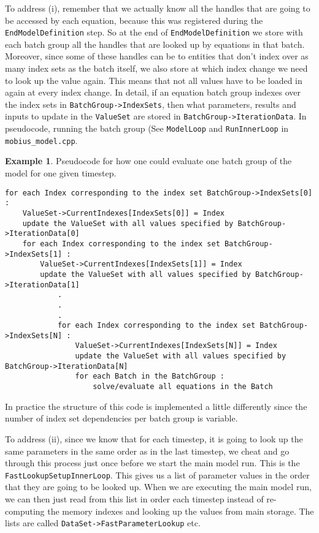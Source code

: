 \documentclass[11pt]{article}
\theoremstyle{definition}
\newtheorem{myexample}{Example}
\newenvironment{example}%
  {\begin{lrbox}{\examplebox}%
   \begin{minipage}{\dimexpr\linewidth-2\fboxsep}
   \begin{myexample}}%
  {\end{myexample}%
   \end{minipage}%
   \end{lrbox}%
   \begin{trivlist}
     \item[]\colorbox{silver}{\usebox\examplebox}
   \end{trivlist}}
\begin{document}
To address (i), remember that we actually know all the handles that are going to be accessed by each equation, because this was registered during the {\tt EndModelDefinition} step. So at the end of {\tt EndModelDefinition} we store with each batch group all the handles that are looked up by equations in that batch. Moreover, since some of these handles can be to entities that don't index over as many index sets as the batch itself, we also store at which index change we need to look up the value again. This means that not all values have to be loaded in again at every index change. In detail, if an equation batch group indexes over the index sets in {\tt BatchGroup->IndexSets}, then what parameters, results and inputs to update in the {\tt ValueSet} are stored in {\tt BatchGroup->IterationData}. In pseudocode, running the batch group (See {\tt ModelLoop} and {\tt RunInnerLoop} in {\tt mobius\_model.cpp}.

\begin{example}
Pseudocode for how one could evaluate one batch group of the model for one given timestep.
\begin{lstlisting}[style = mycpp]
for each Index corresponding to the index set BatchGroup->IndexSets[0] :
	ValueSet->CurrentIndexes[IndexSets[0]] = Index
	update the ValueSet with all values specified by BatchGroup->IterationData[0]
	for each Index corresponding to the index set BatchGroup->IndexSets[1] :
		ValueSet->CurrentIndexes[IndexSets[1]] = Index
		update the ValueSet with all values specified by BatchGroup->IterationData[1]
			.
			.
			.
			for each Index corresponding to the index set BatchGroup->IndexSets[N] :
				ValueSet->CurrentIndexes[IndexSets[N]] = Index
				update the ValueSet with all values specified by BatchGroup->IterationData[N]
				for each Batch in the BatchGroup :
					solve/evaluate all equations in the Batch

\end{lstlisting}
In practice the structure of this code is implemented a little differently since the number of index set dependencies per batch group is variable.
\end{example}

To address (ii), since we know that for each timestep, it is going to look up the same parameters in the same order as in the last timestep, we cheat and go through this process just once before we start the main model run. This is the {\tt FastLookupSetupInnerLoop}. This gives us a list of parameter values in the order that they are going to be looked up. When we are executing the main model run, we can then just read from this list in order each timestep instead of re-computing the memory indexes and looking up the values from main storage. The lists are called {\tt DataSet->FastParameterLookup} etc.
\end{document}
